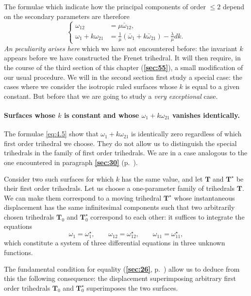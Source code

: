 \documentclass[leqno,11pt]{book}
\numberwithin{equation}{chapter}
\theoremstyle{shape1}
\theoremstyle{shapesmall}
\newcommand{\fsref}[1]{{\rm\textsection\textbf{\ref{sec:#1}}}}
\newcommand{\str}{^{\star}}
\begin{document}
The formulae which indicate how the principal components of order $\le 2$ depend on the secondary parameters are therefore
\begin{equation}
  \label{eq:4.5}
  \left\{
    \begin{aligned}
      \omega_{12}&=\mu\bar\omega_{12},\\
      \omega_{1}+k\omega_{21}&=\frac{1}{\mu}(\bar\omega_{1}+k\bar\omega_{21})-\frac{\lambda}{\mu}dk.
    \end{aligned}
  \right.
\end{equation}
\emph{An peculiarity arises here} which we have not encountered before: the invariant $k$ appears before we have constructed the Frenet trihedral. It will then require, in the course of the third section of this chapter (\fsref{55}), a small modification of our usual procedure. We will in the second section first study a special case: the cases where we consider the isotropic ruled surfaces whose $k$ is equal to a given constant. But before that we are going to study a \emph{very exceptional} case.

\paragraph{Surfaces whose $k$ is constant and whose $\omega_1+k\omega_{21}$ vanishes identically.}
\label{sec:51}
The formulae \eqref{eq:4.5} show that $\omega_{1}+k\omega_{21}$ is identically zero regardless of which first order trihedral we choose. They do not allow us to distinguish the special trihedrals in the family of first order trihedrals. We are in a case analogous to the one encountered in paragraph \fsref{30} (p.~\pageref{sec:30}).

Consider two such surfaces for which $k$ has the same value, and let $\mathbf{T}$ and $\mathbf{T}\str$ be their first order trihedrals. Let us choose a one-parameter family of trihedrals $\mathbf{T}$. We can make them correspond to a moving trihedral $\mathbf{T}\str$ whose instantaneous displacement has the same infinitesimal components such that two arbitrarily chosen trihedrals $\mathbf{T}_{0}$ and $\mathbf{T}\str_{0}$ correspond to each other: it suffices to integrate the equations
\[
\omega_{1}=\omega\str_{1},\qquad\omega_{12}=\omega_{12}\str,\qquad\omega_{11}=\omega\str_{11},
\] 
which constitute a system of three differential equations in three unknown functions.

The fundamental condition for equality (\fsref{26}, p.~\pageref{sec:26}) allow us to deduce from this the following consequence: the displacement superimposing arbitrary first order trihedrals $\mathbf{T}_{0}$ and $\mathbf{T}\str_{0}$ superimposes the two surfaces.
\end{document}
